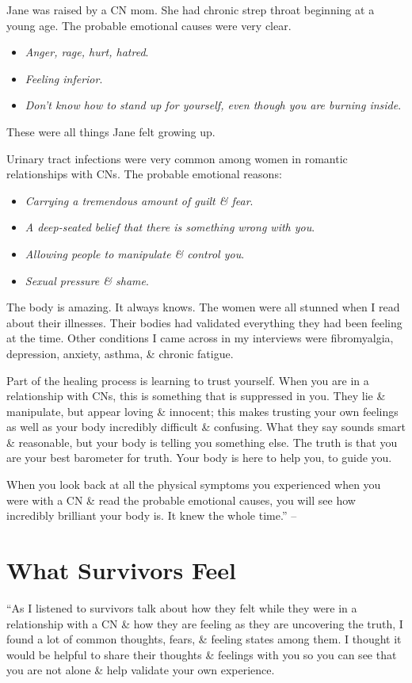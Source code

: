 \documentclass{article}
\numberwithin{equation}{section}
\begin{document}
Jane was raised by a CN mom. She had chronic strep throat beginning at a young age. The probable emotional causes were very clear.
\begin{itemize}
	\item \textit{Anger, rage, hurt, hatred}.
	\item \textit{Feeling inferior}.
	\item \textit{Don't know how to stand up for yourself, even though you are burning inside}.
\end{itemize}
These were all things Jane felt growing up.

Urinary tract infections were very common among women in romantic relationships with CNs. The probable emotional reasons:
\begin{itemize}
	\item \textit{Carrying a tremendous amount of guilt \& fear}.
	\item \textit{A deep-seated belief that there is something wrong with you}.
	\item \textit{Allowing people to manipulate \& control you}.
	\item \textit{Sexual pressure \& shame}.
\end{itemize}
The body is amazing. It always knows. The women were all stunned when I read about their illnesses. Their bodies had validated everything they had been feeling at the time. Other conditions I came across in my interviews were fibromyalgia, depression, anxiety, asthma, \& chronic fatigue.

Part of the healing process is learning to trust yourself. When you are in a relationship with CNs, this is something that is suppressed in you. They lie \& manipulate, but appear loving \& innocent; this makes trusting your own feelings as well as your body incredibly difficult \& confusing. What they say sounds smart \& reasonable, but your body is telling you something else. The truth is that you are your best barometer for truth. Your body is here to help you, to guide you.

When you look back at all the physical symptoms you experienced when you were with a CN \& read the probable emotional causes, you will see how incredibly brilliant your body is. It knew the whole time.'' -- \cite[pp. 142--144]{Mirza2017}


\section{What Survivors Feel}
``As I listened to survivors talk about how they felt while they were in a relationship with a CN \& how they are feeling as they are uncovering the truth, I found a lot of common thoughts, fears, \& feeling states among them. I thought it would be helpful to share their thoughts \& feelings with you so you can see that you are not alone \& help validate your own experience.
\end{document}
